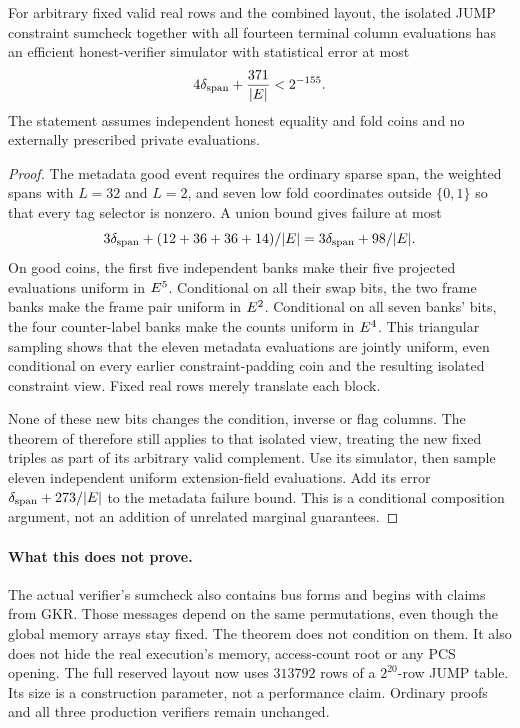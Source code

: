 \begin{theorem}\label{thm:jump-metadata}
For arbitrary fixed valid real rows and the combined layout, the isolated JUMP constraint sumcheck together with all fourteen terminal column evaluations has an efficient honest-verifier simulator with statistical error at most
\[
 4\delta_{\mathrm{span}}+\frac{371}{|E|}<2^{-155}.
\]
The statement assumes independent honest equality and fold coins and no externally prescribed private evaluations.
\end{theorem}
\begin{proof}
The metadata good event requires the ordinary sparse span, the weighted spans with $L=32$ and $L=2$, and seven low fold coordinates outside $\{0,1\}$ so that every tag selector is nonzero. A union bound gives failure at most
\[
 3\delta_{\mathrm{span}}+(12+36+36+14)/|E|
 =3\delta_{\mathrm{span}}+98/|E|.
\]
On good coins, the first five independent banks make their five projected evaluations uniform in $E^5$. Conditional on all their swap bits, the two frame banks make the frame pair uniform in $E^2$. Conditional on all seven banks' bits, the four counter-label banks make the counts uniform in $E^4$. This triangular sampling shows that the eleven metadata evaluations are jointly uniform, even conditional on every earlier constraint-padding coin and the resulting isolated constraint view. Fixed real rows merely translate each block.

None of these new bits changes the condition, inverse or flag columns. The theorem of  therefore still applies to that isolated view, treating the new fixed triples as part of its arbitrary valid complement. Use its simulator, then sample eleven independent uniform extension-field evaluations. Add its error $\delta_{\mathrm{span}}+273/|E|$ to the metadata failure bound. This is a conditional composition argument, not an addition of unrelated marginal guarantees.
\end{proof}

\paragraph{What this does not prove.} The actual verifier's sumcheck also contains bus forms and begins with claims from GKR. Those messages depend on the same permutations, even though the global memory arrays stay fixed. The theorem does not condition on them. It also does not hide the real execution's memory, access-count root or any PCS opening. The full reserved layout now uses $313792$ rows of a $2^{20}$-row JUMP table. Its size is a construction parameter, not a performance claim. Ordinary proofs and all three production verifiers remain unchanged.

